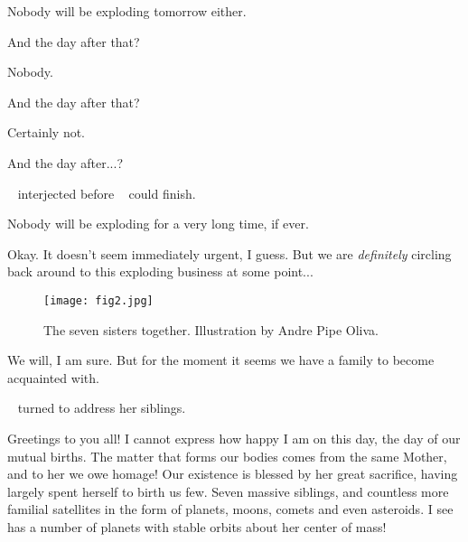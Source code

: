 \documentclass[main.tex]{subfiles}
\begin{document}
\par \Maia Nobody will be exploding tomorrow either.

\par \Merope And the day after that?

\par \Maia Nobody.

\par \Merope And the day after that?

\par \Maia Certainly not.

\par \Merope And the day after...?

\par \nar \rmmaia~ interjected before \rmmerope~ could finish.

\par \Maia Nobody will be exploding for a very long time, if ever.

\par \Merope Okay.  It doesn't seem immediately urgent, I guess. But we are \textit{definitely} circling back around to this exploding business at some point...

\begin{figure}
\texttt{[image: fig2.jpg]}
\caption{The seven sisters together.  Illustration by Andre Pipe Oliva.
\label{fig:fig2}}
\end{figure}

\par \Maia We will, I am sure.  But for the moment it seems we have a family to become acquainted with.

\par \nar \rmmaia~ turned to address her siblings.


\par \Maia Greetings to you all!  I cannot express how happy I am on this day, the day of our mutual births.  The matter that forms our bodies comes from the same Mother, and to her we owe homage!  Our existence is blessed by her great sacrifice, having largely spent herself to birth us few.  Seven massive siblings, and countless more familial satellites in the form of planets, moons, comets and even asteroids.  I see \rmelectra has a number of planets with stable orbits about her center of mass!  
\end{document}
